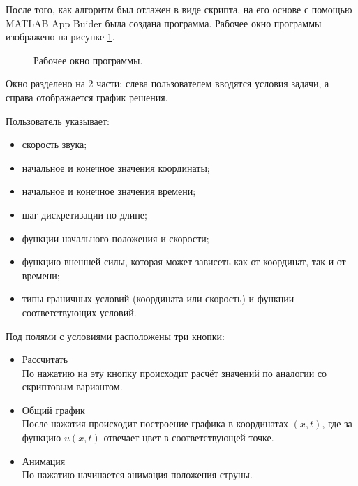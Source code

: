 \documentclass[12pt,a4paper,russian]{report}
\begin{document}
	 
	 После того, как алгоритм был отлажен в виде скрипта, на его основе с помощью MATLAB App Buider была создана программа. Рабочее окно программы изображено на рисунке \ref{img:program}.
	 
	 \begin{figure}[h]
	 	\caption{Рабочее окно программы.}
	 	\label{img:program}
	 \end{figure}
	 
	 Окно разделено на 2 части: слева пользователем вводятся условия задачи, а справа отображается график решения.
	 
	 Пользователь указывает:
	 \begin{itemize}
	 	\item скорость звука;
	 	\item начальное и конечное значения координаты;
	 	\item начальное и конечное значения времени;
	 	\item шаг дискретизации по длине;
	 	\item функции начального положения и скорости;
	 	\item функцию внешней силы, которая может зависеть как от координат, так и от времени;
	 	\item типы граничных условий (координата или скорость) и функции соответствующих условий.
	 \end{itemize}
	 
	 Под полями с условиями расположены три кнопки:
	 \begin{itemize}
	 	\item Рассчитать \\
	 	По нажатию на эту кнопку происходит расчёт значений по аналогии со скриптовым вариантом.
	 	
	 	\item  Общий график \\
	 	После нажатия происходит построение графика в координатах $(x, t)$, где за функцию $u(x, t)$ отвечает цвет в соответствующей точке.
	 	
	 	\item Анимация \\
	 	По нажатию начинается анимация положения струны.
	 \end{itemize}
	 
\end{document}
